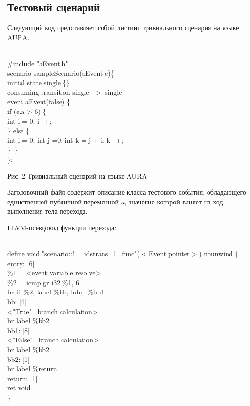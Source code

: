 \documentclass[12pt,a4paper]{article}
\begin{document}
\subsection{Тестовый сценарий}
Следующий код представляет собой листинг тривиального сценария на языке AURA.
{\lstset{language=C++}
\begin{tabbing}
\quad\=\quad\=\quad\=\quad\=\quad\=\quad\=\\
\#include "aEvent.h"\\
scenario sampleScenario(aEvent e)\{\\
\>initial state single \{\}\\
\>consuming transition single -$>$ single\\
\>\>event aEvent(false) \{\\
\>\>\>if (e.a > 6) \{\\
\>\>\>\>int i = 0; i++;\\
\>\>\>\} else \{\\
\>\>\>\>int i = 0; int j =0; int k = j + i; k++;\\
\>\>\>\}\
\>\>\}\\
\};\\
\end{tabbing}
}
{\center Рис. 2 Тривиальный сценарий на языке AURA}

Заголовочный файл содержит описание класса тестового события, обладающего единственной публичной переменной $a$, значение которой влияет на ход выполнения тела перехода.

LLVM-псевдокод функции перехода:
{\lstset{language=c}
\begin{tabbing}
\quad\quad\=\\
define void \@"scenario::!\_\_idstrans\_1\_func"($<$Event pointer$>$) nounwind \{\\
entry: [6]\\
\>\%1 = <event variable resolve>\\
\>\%2 = icmp gr i32 \%1, 6 \\
\>br i1 \%2, label \%bb, label \%bb1 \\
bb: [4]\\
\><"True"~ branch calculation>\\
\>br label \%bb2\\
bb1: [8]\\
\><"False"~ branch calculation>\\
\>br label \%bb2\\
bb2: [1]\\
\>br label \%return\\
return: [1]\\
\>ret void\\
\}\\
\end{tabbing}}
\end{document}
